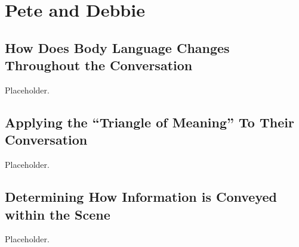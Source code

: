 \documentclass[stu,12pt]{apa7}
\begin{document}
  \section{Pete and Debbie}
    \subsection{How Does Body Language Changes Throughout the Conversation}
      Placeholder.

    \subsection{Applying the ``Triangle of Meaning'' To Their Conversation}
      Placeholder.

    \subsection{Determining How Information is Conveyed within the Scene}
      Placeholder.




  \newpage
  \nocite{*}
  \printbibliography[%
    title={Additional References},%
    heading={bibintoc},%
    category={consulted}%
  ]
\end{document}
